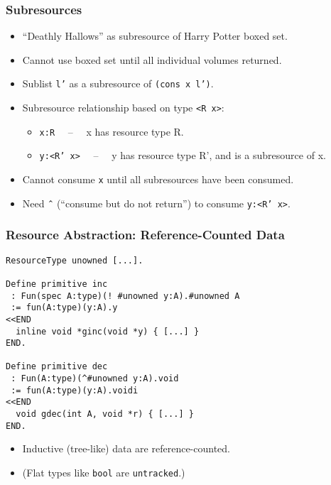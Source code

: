 \documentclass[10pt]{beamer}
\begin{document}
\begin{frame}
\frametitle{Subresources}

\begin{itemize}
\item ``Deathly Hallows'' as subresource of Harry Potter boxed set.
\item Cannot use boxed set until all individual volumes returned.
\item Sublist \texttt{l'} as a subresource of \texttt{(cons x l')}.
\item Subresource relationship based on type \texttt{<R x>}:
\begin{itemize}
\item \texttt{x:R} \ \ -- \ \ x has resource type R.
\item \texttt{y:<R' x>} \ \ -- \ \  y has resource type R', and is a subresource of x.
\end{itemize}

\item Cannot consume \texttt{x} until all subresources have been consumed.
\item Need \textbf{\^{\ }} (``consume but do not return'') to consume \texttt{y:<R' x>}.
\end{itemize}

\end{frame}

\begin{frame}[containsverbatim]
\frametitle{Resource Abstraction: Reference-Counted Data}
{
\footnotesize
\begin{verbatim}
ResourceType unowned [...].

Define primitive inc
 : Fun(spec A:type)(! #unowned y:A).#unowned A
 := fun(A:type)(y:A).y 
<<END
  inline void *ginc(void *y) { [...] }
END.

Define primitive dec
 : Fun(A:type)(^#unowned y:A).void
 := fun(A:type)(y:A).voidi 
<<END
  void gdec(int A, void *r) { [...] }
END.
\end{verbatim}
}

\begin{itemize}
\item Inductive (tree-like) data are reference-counted.

\item (Flat types like \texttt{bool} are \texttt{untracked}.)
\end{itemize}
\end{frame}
\end{document}
